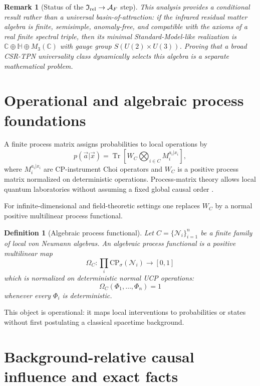 \documentclass[11pt]{article}
\newtheorem{definition}[theorem]{Definition}
\newtheorem{remark}[theorem]{Remark}
\newcommand{\A}{\mathcal A}
\newcommand{\I}{\mathfrak I}
\newcommand{\N}{\mathcal N}
\newcommand{\Tr}{\operatorname{Tr}}
\begin{document}
\begin{remark}[Status of the $\I_{\rm rel}\to\A_F$ step]\label{rem:irel-af-status}
This analysis provides a conditional result rather than a universal basin-of-attraction: if the infrared residual matter algebra is finite, semisimple, anomaly-free, and compatible with the axioms of a real finite spectral triple, then its minimal Standard-Model-like realization is $\mathbb C\oplus\mathbb H\oplus M_3(\mathbb C)$ with gauge group $S(U(2)\times U(3))$.  Proving that a broad CSR-TPN universality class dynamically selects this algebra is a separate mathematical problem.
\end{remark}



\section{Operational and algebraic process foundations}
\label{sec:process-algebra}

A finite process matrix assigns probabilities to local operations by
\[
p(\vec a|\vec x)=\Tr\left[W_C\bigotimes_{i\in C}M_i^{a_i|x_i}\right],
\]
where $M_i^{a_i|x_i}$ are CP-instrument Choi operators and $W_C$ is a positive process matrix normalized on deterministic operations.  Process-matrix theory allows local quantum laboratories without assuming a fixed global causal order \cite{OCB2012}.

For infinite-dimensional and field-theoretic settings one replaces $W_C$ by a normal positive multilinear process functional.

\begin{definition}[Algebraic process functional]
Let $C=\{\N_i\}_{i=1}^n$ be a finite family of local von Neumann algebras.  An algebraic process functional is a positive multilinear map
\[
\Omega_C:\prod_i \mathrm{CP}_\sigma(\N_i)\to[0,1]
\]
which is normalized on deterministic normal UCP operations:
\[
\Omega_C(\Phi_1,\ldots,\Phi_n)=1
\]
whenever every $\Phi_i$ is deterministic.
\end{definition}

This object is operational: it maps local interventions to probabilities or states without first postulating a classical spacetime background.

\section{Background-relative causal influence and exact facts}
\end{document}
